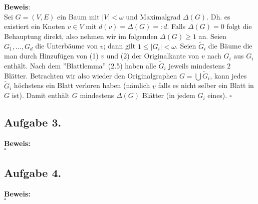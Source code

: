 \documentclass[11pt,a4paper,ngerman]{article}
\begin{document}
\textbf{Beweis}:\\
Sei $G=(V,E)$ ein Baum mit $|V| < \omega$ und Maximalgrad $\Delta(G)$.
Dh. es existiert ein Knoten $v \in V$ mit $d(v) = \Delta(G) =: d$. 
Falls $\Delta(G) = 0$
folgt die Behauptung direkt, also nehmen wir im folgenden $\Delta(G) \geq 1$ an.
Seien $G_1,\ldots,G_d$ die Unterbäume von $v$; dann gilt $1\leq |G_i| < \omega$. 
Seien $\tilde{G}_i$ die Bäume die man durch Hinzufügen von
(1) $v$ und (2) der Originalkante von $v$ nach $G_i$ aus $G_i$ enthält.
Nach dem ''Blattlemma'' (2.5) haben alle $\tilde{G}_i$ jeweils mindestens $2$ Blätter.
Betrachten wir also wieder den Originalgraphen $G = \bigcup \tilde{G}_i$, kann jedes
$\tilde{G}_i$ höchstens ein Blatt verloren haben (nämlich $v$ falls es nicht selber ein Blatt in $G$ ist). 
Damit enthält $G$ mindestens $\Delta(G)$ Blätter (in jedem $G_i$ eines).
\mbox{}\hfill$\square$

\subsection*{Aufgabe 3.}
\textbf{Beweis:}\\
\mbox{}\hfill$\square$

\subsection*{Aufgabe 4.}

\textbf{Beweis:}\\

\mbox{}\hfill$\square$

\label{LastPage}
\end{document}
